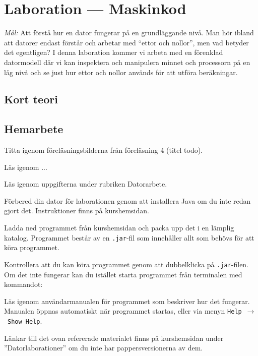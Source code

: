 
\section{Laboration  --- Maskinkod}

\emph{Mål:} Att förstå hur en dator fungerar på en grundläggande nivå. Man hör ibland att datorer endast förstår och arbetar med ``ettor och nollor'', men vad betyder det egentligen? I denna laboration kommer vi arbeta med en förenklad datormodell där vi kan inspektera och manipulera minnet och processorn på en låg nivå och se just hur ettor och nollor används för att utföra beräkningar.

\subsection{Kort teori}



\subsection*{Hemarbete}
\begin{Hemarbete}\firmlist
    \item Titta igenom föreläsningsbilderna från föreläsning 4 (titel todo).
    \item Läs igenom ...
    \item Läs igenom uppgifterna under rubriken Datorarbete.
    \item Förbered din dator för laborationen genom att installera Java om du inte redan gjort det. Instruktioner finns på kurshemsidan.
    \item Ladda ned programmet \textbf{\progname{}} från kurshemsidan och packa upp det i en lämplig katalog. Programmet består av en \texttt{.jar}-fil som innehåller allt som behövs för att köra programmet.
    \item Kontrollera att du kan köra programmet genom att dubbelklicka på \texttt{.jar}-filen. Om det inte fungerar kan du istället starta programmet från terminalen med kommandot:
    \begin{center}
        {}
    \end{center}
    \item Läs igenom användarmanualen för programmet som beskriver hur det fungerar. Manualen öppnas automatiskt när programmet startas, eller via menyn \texttt{Help}~$\rightarrow$~\texttt{Show Help}.
\end{Hemarbete}
Länkar till det ovan refererade materialet finns på kurshemsidan under  ''Datorlaborationer'' om du inte har pappersversionerna av dem.

